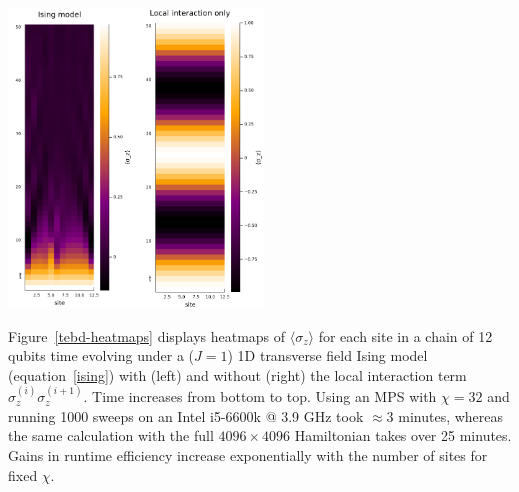 \documentclass[12pt]{article}
\newenvironment{Figure}
  {\par\medskip\noindent\minipage{\linewidth}}
  {\endminipage\par\medskip}
\begin{document}
\begin{multicols}{2}
	\begin{Figure}
		\center\includegraphics[height=300px]{./Figures/ising_heatmap.png}\includegraphics[height=300px]{./Figures/local_heatmap.png}
		\label{tebd-heatmaps}
	\end{Figure}

	Figure~\ref{tebd-heatmaps} displays heatmaps of $\langle\sigma_z\rangle$ for each
		site in a chain of 12 qubits time evolving under a ($J=1$) 1D transverse field Ising model (equation~\ref{ising}) with (left) and without (right) the local interaction term
		$\sigma_z^{(i)}\sigma_z^{(i+1)}$. Time increases from bottom to top. Using an MPS with $\chi=32$ and
		running 1000 sweeps on an Intel i5-6600k @ 3.9 GHz took $\approx3$ minutes, whereas the same calculation with the full $4096\times4096$ Hamiltonian takes over 25 minutes. Gains in runtime efficiency increase exponentially with the number of sites for fixed $\chi$.


\end{multicols}
\end{document}
